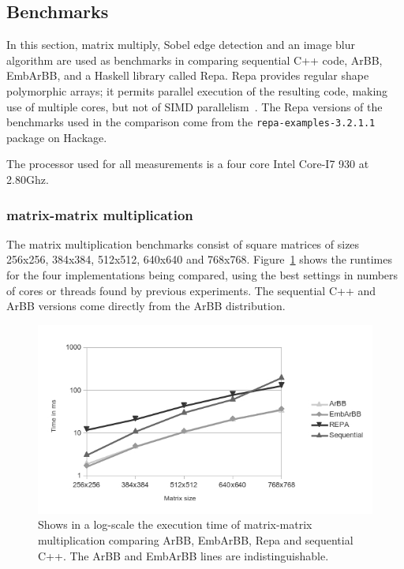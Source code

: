\subsection{Benchmarks}
\label{sec:EmbArBBBenchmarks}

In this section, matrix multiply, Sobel edge detection and an image blur
algorithm are used as benchmarks in comparing sequential C++ code, ArBB, EmbArBB, 
and a Haskell library called Repa. 
Repa provides regular shape polymorphic arrays; it permits
parallel execution of the resulting code, making use of multiple
cores, but not of SIMD parallelism~.
The Repa versions of the benchmarks used in the comparison 
come from the {\tt repa-examples-3.2.1.1} package on Hackage. 

The processor used for all measurements is a four core Intel Core-I7 930 at 
2.80Ghz. 

\subsubsection{matrix-matrix multiplication}
The matrix multiplication benchmarks consist of square matrices 
of sizes 256x256, 384x384, 512x512, 640x640 and 768x768. 
Figure~\ref{fig:mmchart1} shows the runtimes for the four implementations 
being compared, using the best settings in numbers of cores or threads found 
by previous experiments. The sequential C++ and ArBB versions come 
directly from the ArBB distribution.

\begin{figure}
\includegraphics[width=\linewidth]{./embarbb/img/mmchart1}
\caption{Shows in a log-scale the execution time of matrix-matrix multiplication
         comparing ArBB, EmbArBB, Repa and sequential C++. The ArBB and 
         EmbArBB lines are indistinguishable.}
\label{fig:mmchart1}
\end{figure}

